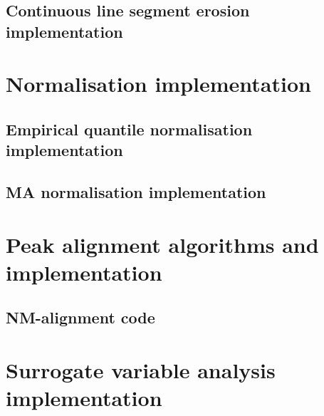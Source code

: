 \documentclass[12pt,a4paper,oneside]{report}
\begin{document}
\begin{appendix}


	



\section{Continuous line segment erosion implementation} \label{clsa}

	


\clearpage

\chapter{Normalisation implementation}


\section{Empirical quantile normalisation implementation} \label{Quantnormcode}

	
	
\clearpage

\section{MA normalisation implementation} \label{MAnormcode}

	
	
\clearpage

\chapter{Peak alignment algorithms and implementation} \label{pacodes}


\section{NM-alignment code} \label{nm}

	


	






	
	
\clearpage


\chapter{Surrogate variable analysis implementation} \label{sva}



\end{appendix}
\end{document}
